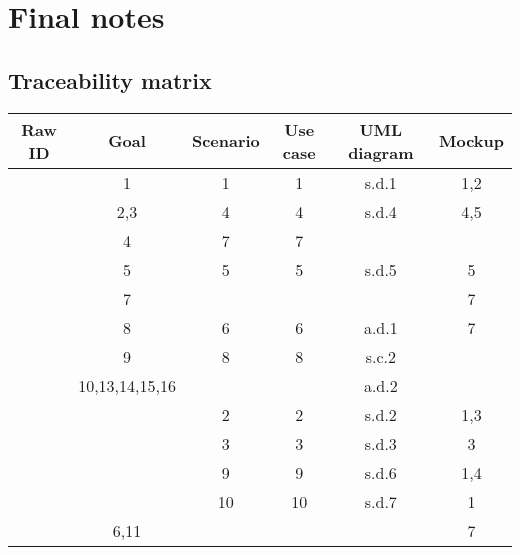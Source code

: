 \pagebreak
\section{Final notes}

\subsection{Traceability matrix}


\newcommand{\Row}[5]{
	\stepcounter{RowID}
	\arabic{RowID} & #1 & #2 & #3 & #4 & #5 \\

}

\begin{center}
	\vspace{0.2cm}
	\begin{tabular}{c c c c c c}
			\hline
			\textbf{Raw ID}	& \textbf{Goal}	& \textbf{Scenario}	& \textbf{Use case}	& \textbf{UML diagram} & \textbf{Mockup}	\\
			\hline
			\Row{1}{1}{1}{s.d.1}{1,2}
			\Row{2,3}{4}{4}{s.d.4}{4,5}
			\Row{4}{7}{7}{}{}
			\Row{5}{5}{5}{s.d.5}{5}
			\Row{7}{}{}{}{7}
			\Row{8}{6}{6}{a.d.1}{7}
			\Row{9}{8}{8}{s.c.2}{}
			\Row{10,13,14,15,16}{}{}{a.d.2}{}
			\Row{}{2}{2}{s.d.2}{1,3}
			\Row{}{3}{3}{s.d.3}{3}
			\Row{}{9}{9}{s.d.6}{1,4}
			\Row{}{10}{10}{s.d.7}{1}
			\Row{6,11}{}{}{}{7}
			
			\hline
	\end{tabular}
\end{center}
